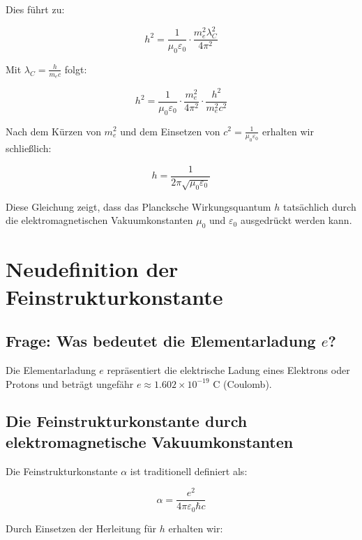 \documentclass{article}
\begin{document}
	Dies führt zu:
	
	\begin{equation}
		h^2 = \frac{1}{\mu_0\varepsilon_0} \cdot \frac{m_e^2 \lambda_C^2}{4\pi^2}
	\end{equation}
	
	Mit $\lambda_C = \frac{h}{m_e c}$ folgt:
	
	\begin{equation}
		h^2 = \frac{1}{\mu_0\varepsilon_0} \cdot \frac{m_e^2}{4\pi^2} \cdot \frac{h^2}{m_e^2c^2}
	\end{equation}
	
	Nach dem Kürzen von $m_e^2$ und dem Einsetzen von $c^2 = \frac{1}{\mu_0\varepsilon_0}$ erhalten wir schließlich:
	
	\begin{equation}
		h = \frac{1}{2\pi\sqrt{\mu_0\varepsilon_0}}
	\end{equation}
	
	Diese Gleichung zeigt, dass das Plancksche Wirkungsquantum $h$ tatsächlich durch die elektromagnetischen Vakuumkonstanten $\mu_0$ und $\varepsilon_0$ ausgedrückt werden kann.
	
	\section{Neudefinition der Feinstrukturkonstante}
	
	\subsection{Frage: Was bedeutet die Elementarladung $e$?}
	
	Die Elementarladung $e$ repräsentiert die elektrische Ladung eines Elektrons oder Protons und beträgt ungefähr $e \approx 1.602 \times 10^{-19}$ C (Coulomb).
	
	\subsection{Die Feinstrukturkonstante durch elektromagnetische Vakuumkonstanten}
	
	Die Feinstrukturkonstante $\alpha$ ist traditionell definiert als:
	
	\begin{equation}
		\alpha = \frac{e^2}{4\pi\varepsilon_0\hbar c}
	\end{equation}
	
	Durch Einsetzen der Herleitung für $h$ erhalten wir:
	
\end{document}
